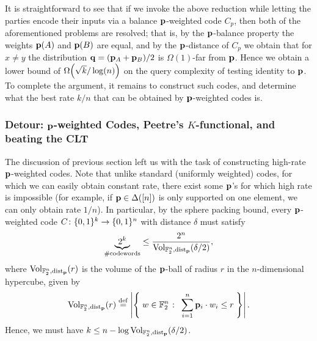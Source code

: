 It is straightforward to see that if we invoke the above reduction while letting the parties encode their inputs via a balance $\p$-weighted code $C_p$, then both of the aforementioned problems are resolved; that is, by the $\p$-balance property the weights $\p(A)$ and $\p(B)$ are equal, and by the $\p$-distance of $C_p$ we obtain that for $x \neq y$ the distribution $\q = (\p_A + \p_B)/2$ is $\Omega(1)$-far from $\p$. Hence we obtain a lower bound of $\bigOmega{ \sqrt{k}/\log(n) }$ on the query complexity of testing identity to $\p$. To complete the argument, it remains to construct such codes, and determine what the best rate $k/n$ that can be obtained by $\p$-weighted codes is.

\subsubsection{Detour: $\p$-weighted Codes, Peetre's $K$-functional, and beating the CLT}
\label{sec:overview:detour}
The discussion of previous section left us with the task of constructing high-rate $\p$-weighted codes. Note that unlike standard (uniformly weighted) codes, for which we can easily obtain constant rate, there exist some $\p$'s for which high rate is impossible (for example, if $\p\in\distribs{[n]}$ is only supported on one element, we can only obtain rate $1/n$). In particular, by the sphere packing bound, every $\p$-weighted code $C\colon\bitset^k \to\bitset^n$ with distance $\delta$  must satisfy
\[
      \underbrace{2^k}_{\#\text{codewords}} \leq \frac{2^n}{\operatorname{Vol}_{\mathbb{F}_2^n,\pdistfunc[\p]}(\delta/2) },
\]
where $\operatorname{Vol}_{\mathbb{F}_2^n,\pdistfunc[\p]}(r)$ is the volume of the $\p$-ball of radius $r$ in the $n$-dimensional hypercube, given by
\[
 \operatorname{Vol}_{\mathbb{F}_2^n,\pdistfunc[\p]}(r) 
    \eqdef \abs{ \setOfSuchThat{w\in \mathbb{F}_2^n }{\sum_{i=1}^{n} \p_i\cdot w_i \leq r } }.
\]
Hence, we must have $k \leq n - \log \operatorname{Vol}_{\mathbb{F}_2^n,\pdistfunc[\p]}(\delta/2)$.

